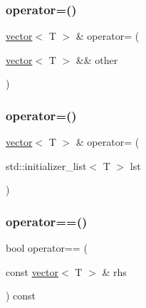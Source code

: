 \mbox{\label{classvector_aa2bf38f1f948638605444ce95d16a663}} 
\subsubsection{\texorpdfstring{operator=()}{operator=()}\hspace{0.1cm}{\footnotesize\ttfamily [2/3]}}
{\footnotesize\ttfamily \mbox{\hyperlink{classvector}{vector}}$<$ T $>$ \& operator= (\begin{DoxyParamCaption}\item[{\mbox{\hyperlink{classvector}{vector}}$<$ T $>$ \&\&}]{other }\end{DoxyParamCaption})}

\mbox{\label{classvector_a5f6769205da0b796713428b1459e327c}} 
\subsubsection{\texorpdfstring{operator=()}{operator=()}\hspace{0.1cm}{\footnotesize\ttfamily [3/3]}}
{\footnotesize\ttfamily \mbox{\hyperlink{classvector}{vector}}$<$ T $>$ \& operator= (\begin{DoxyParamCaption}\item[{std\+::initializer\+\_\+list$<$ T $>$}]{lst }\end{DoxyParamCaption})}

\mbox{\label{classvector_a88f9c524540044b38f3764402630ae1a}} 
\subsubsection{\texorpdfstring{operator==()}{operator==()}}
{\footnotesize\ttfamily bool operator== (\begin{DoxyParamCaption}\item[{const \mbox{\hyperlink{classvector}{vector}}$<$ T $>$ \&}]{rhs }\end{DoxyParamCaption}) const}

\mbox{\label{classvector_a37d3ca28d74899424961724b24c0f3a2}} 
